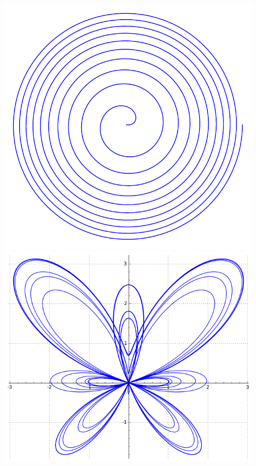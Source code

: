 \begin{frame}[fragile]
\begin{center}
\includegraphics[scale=0.3]{figures/fermat_spiral}\quad
\includegraphics[scale=0.255]{figures/butterfly_curve}  
\end{center}

\pause


\end{frame}
